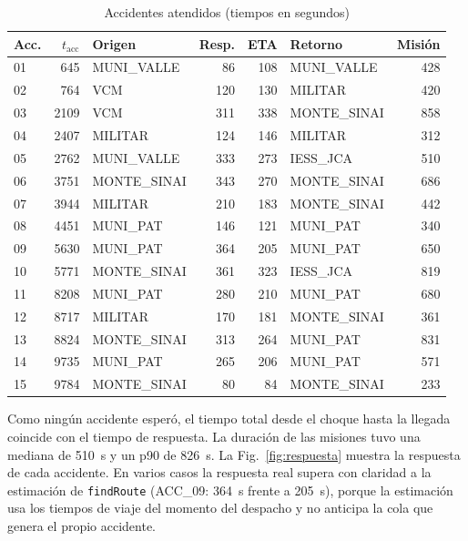 \documentclass[conference,a4paper]{IEEEtran}
\begin{document}
\begin{table}[!t]
\centering
\caption{Accidentes atendidos (tiempos en segundos)}
\label{tab:acc}
\footnotesize
\setlength{\tabcolsep}{3.5pt}
\begin{tabular}{@{}lrlrrlr@{}}
\toprule
Acc. & $t_{\mathrm{acc}}$ & Origen & Resp. & ETA & Retorno & Misión \\
\midrule
01 & 645  & MUNI\_VALLE  & 86  & 108 & MUNI\_VALLE  & 428 \\
02 & 764  & VCM          & 120 & 130 & MILITAR      & 420 \\
03 & 2109 & VCM          & 311 & 338 & MONTE\_SINAI & 858 \\
04 & 2407 & MILITAR      & 124 & 146 & MILITAR      & 312 \\
05 & 2762 & MUNI\_VALLE  & 333 & 273 & IESS\_JCA    & 510 \\
06 & 3751 & MONTE\_SINAI & 343 & 270 & MONTE\_SINAI & 686 \\
07 & 3944 & MILITAR      & 210 & 183 & MONTE\_SINAI & 442 \\
08 & 4451 & MUNI\_PAT    & 146 & 121 & MUNI\_PAT    & 340 \\
09 & 5630 & MUNI\_PAT    & 364 & 205 & MUNI\_PAT    & 650 \\
10 & 5771 & MONTE\_SINAI & 361 & 323 & IESS\_JCA    & 819 \\
11 & 8208 & MUNI\_PAT    & 280 & 210 & MUNI\_PAT    & 680 \\
12 & 8717 & MILITAR      & 170 & 181 & MONTE\_SINAI & 361 \\
13 & 8824 & MONTE\_SINAI & 313 & 264 & MUNI\_PAT    & 831 \\
14 & 9735 & MUNI\_PAT    & 265 & 206 & MUNI\_PAT    & 571 \\
15 & 9784 & MONTE\_SINAI & 80  & 84  & MONTE\_SINAI & 233 \\
\bottomrule
\end{tabular}
\end{table}

Como ningún accidente esperó, el tiempo total desde el choque hasta la llegada coincide
con el tiempo de respuesta. La duración de las misiones tuvo una mediana de 510~s y un
p90 de 826~s. La Fig.~\ref{fig:respuesta} muestra la respuesta de cada accidente. En
varios casos la respuesta real supera con claridad a la estimación de \texttt{findRoute}
(ACC\_09: 364~s frente a 205~s), porque la estimación usa los tiempos de viaje del
momento del despacho y no anticipa la cola que genera el propio accidente.
\end{document}
